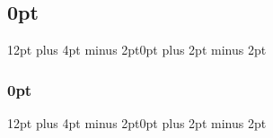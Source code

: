 \subsection{0pt}{12pt plus 4pt minus 2pt}{0pt plus 2pt minus 2pt}
\titlespacing
\subsubsection{0pt}{12pt plus 4pt minus 2pt}{0pt plus 2pt minus 2pt}

\newenvironment{hint}[1][]
{
\begin{em}\textbf{Hint: }}{
\end{em}}

\ifshowsolutions
\newenvironment{solution}[1][]
{\par\medskip
  \begin{mdframed}\textbf{Solution~\Alph{question}#1:}
  \begin{em}}
    {
    \end{em}\medskip
\end{mdframed}\medskip}
\newenvironment{subsolution}[1][]
{\par\medskip
  \begin{mdframed}\textbf{Solution~\Alph{question}#1.\roman{subquestion}:}
  \begin{em}}
    {
    \end{em}\medskip
\end{mdframed}\medskip}
\else
{}
\fi